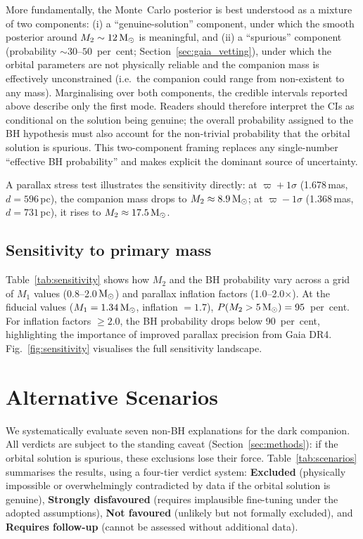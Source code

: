 \documentclass[usenatbib,fleqn]{mnras}
\newcommand{\Msun}{{\rm M}_\odot}
\begin{document}
More fundamentally, the Monte~Carlo posterior is best understood
as a mixture of two components: (i) a ``genuine-solution''
component, under which the smooth posterior around
$M_2 \sim 12\,\Msun$ is meaningful, and (ii) a ``spurious''
component (probability $\sim 30$--$50$~per~cent;
Section~\ref{sec:gaia_vetting}), under which the orbital
parameters are not physically reliable and the companion mass is
effectively unconstrained (i.e.\ the companion could range from
non-existent to any mass).  Marginalising over both components,
the credible intervals reported above describe only the first
mode.  Readers should therefore interpret the CIs as conditional
on the solution being genuine; the overall probability assigned to
the BH hypothesis must also account for the non-trivial
probability that the orbital solution is spurious.  This two-component
framing replaces any single-number ``effective BH probability'' and
makes explicit the dominant source of uncertainty.

A parallax stress test illustrates the sensitivity directly:
at $\varpi + 1\sigma$ (1.678\,mas, $d = 596$\,pc), the
companion mass drops to $M_2 \approx 8.9\,\Msun$; at
$\varpi - 1\sigma$ (1.368\,mas, $d = 731$\,pc), it rises to
$M_2 \approx 17.5\,\Msun$.

\subsection{Sensitivity to primary mass}
\label{sec:results:sensitivity}

Table~\ref{tab:sensitivity} shows how $M_2$ and the BH
probability vary across a grid of $M_1$ values
(0.8--2.0\,$\Msun$) and parallax inflation factors
(1.0--2.0$\times$).  At the fiducial values ($M_1 = 1.34\,\Msun$,
inflation $= 1.7$), $P(M_2 > 5\,\Msun) = 95$~per~cent.
For inflation factors $\geq 2.0$, the BH probability drops
below 90~per~cent, highlighting the importance of improved
parallax precision from Gaia DR4.
Fig.~\ref{fig:sensitivity} visualises the full sensitivity
landscape.

\section{Alternative Scenarios}
\label{sec:alternatives}

We systematically evaluate seven non-BH explanations for the dark
companion.  All verdicts are subject to the standing caveat
(Section~\ref{sec:methods}): if the orbital solution is spurious,
these exclusions lose their force.  Table~\ref{tab:scenarios} summarises the results,
using a four-tier verdict system: \textbf{Excluded} (physically
impossible or overwhelmingly contradicted by data if the
orbital solution is genuine),
\textbf{Strongly disfavoured} (requires implausible fine-tuning
under the adopted assumptions),
\textbf{Not favoured} (unlikely but not formally excluded),
and \textbf{Requires follow-up} (cannot be assessed without
additional data).
\end{document}
